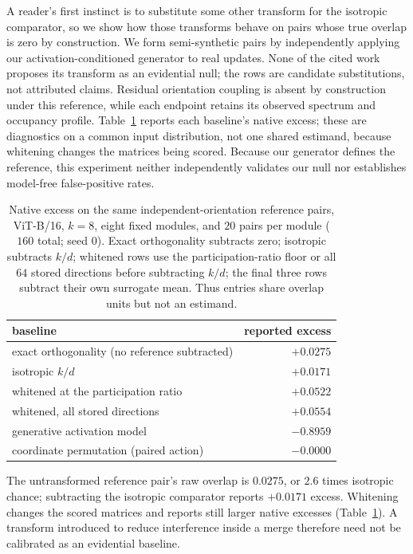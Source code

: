 A reader's first instinct is to substitute some other transform for the isotropic comparator, so we
show how those transforms behave on pairs whose true overlap is zero by construction. We form
semi-synthetic pairs by independently applying our activation-conditioned generator to real
updates. None of the cited work proposes its transform as an evidential null; the rows are
candidate substitutions, not attributed claims. Residual orientation
coupling is absent by construction under this reference, while each endpoint retains its observed
spectrum and occupancy profile. Table~\ref{tab:baselines} reports each baseline's native excess;
these are diagnostics on a common input distribution, not one shared estimand, because whitening
changes the matrices being scored. Because our generator defines the reference, this experiment
neither independently validates our null nor establishes model-free false-positive rates.
\begin{table}[t]
\centering
\caption{Native excess on the same independent-orientation reference pairs, ViT-B/16, $k=8$,
eight fixed modules, and $20$ pairs per module ($160$ total; seed $0$). Exact orthogonality subtracts zero; isotropic subtracts $k/d$;
whitened rows use the participation-ratio floor or all $64$ stored directions before subtracting
$k/d$; the final three rows subtract their
own surrogate mean. Thus entries share overlap units but not an estimand.}
\label{tab:baselines}
\begin{tabular}{@{}lr@{}}
\toprule
baseline & reported excess \\
\midrule
exact orthogonality (no reference subtracted)        & $+0.0275$ \\
isotropic $k/d$                                     & $+0.0171$ \\
whitened at the participation ratio                 & $+0.0522$ \\
whitened, all stored directions                     & $+0.0554$ \\
generative activation model                         & $-0.8959$ \\
coordinate permutation (paired action)              & $-0.0000$ \\
\bottomrule
\end{tabular}
\end{table}

The untransformed reference pair's raw overlap is $0.0275$, or $2.6$ times isotropic chance;
subtracting the isotropic comparator reports $+0.0171$ excess. Whitening changes the scored
matrices and reports still larger native excesses
(Table~\ref{tab:baselines}). A transform introduced
to reduce interference inside a merge therefore need not be calibrated as an evidential baseline.

